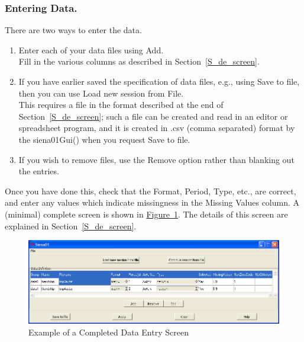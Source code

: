 \documentclass[a4paper,fleqn,11pt]{article}
\newcommand{\+}{\, + \,}
\newcommand{\sfn}[1]{\textsf{#1}}
\begin{document}
{\subsubsection{Entering Data.}
\label{thegui}
There are two ways to enter the data.
\begin{enumerate}
\item Enter each of your data files using \sfn{Add}.\\
      Fill in the various columns as described in Section~\ref{S_de_screen}.
\item If you have earlier saved the specification
      of data files, e.g., using \sfn{Save to file}, then you can
      use \sfn{Load new session from File}.\\
      This requires a file in the format described
      at the end of  Section~\ref{S_de_screen};
      such a file can be created and read in an editor or spreadsheet program,
      and it is created in .csv (comma separated) format
      by the \sfn{ siena01Gui()} when you request
      \sfn{Save to file}.
\item If you wish to remove files, use the \sfn{Remove} option rather than
  blanking out the entries.
\end{enumerate}
Once you have done this, check that the \sfn{Format},
\sfn{Period}, \sfn{Type}, etc., are correct, and enter any
values which indicate missingness in the \sfn{Missing Values} column.
A (minimal) complete screen is shown in \hyperlink{siena2}
{Figure~\ref{fig:siena2}}.
The details of this screen are explained in Section~\ref{S_de_screen}.
  \begin{figure}[ht]
\hypertarget{siena2}{}
    \begin{center}
      \includegraphics[width=\textwidth]{siena2.png}
    \end{center}
 \caption{Example of a Completed Data Entry Screen}
 \label{fig:siena2}
\end{figure}

}
\end{document}
